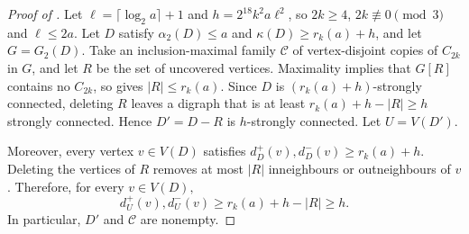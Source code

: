 \documentclass[11pt,a4paper]{article}
\theoremstyle{remark}
\numberwithin{equation}{section}
\newcommand{\calC}{\mathcal{C}}
\newcommand{\al}{\alpha_2}
\begin{document}
	\begin{proof}[Proof of ]
		Let $\ell=\lceil\log_2 a\rceil+1$ and $h=2^{18}k^2a\ell^2$, so $2k\ge4$, $2k\not\equiv0\pmod{3}$ and
		$\ell\le2a$.
		Let $D$ satisfy $\al(D)\le a$ and $\kappa(D)\ge r_k(a)+h$, and let $G=G_2(D)$.
		Take an inclusion-maximal family $\calC$ of vertex-disjoint copies of $C_{2k}$ in $G$,
		and let $R$ be the set of uncovered vertices.
		Maximality implies that $G[R]$ contains no $C_{2k}$, so
		 gives
		$
		|R|\le r_k(a).
		$
		Since $D$ is $(r_k(a)+h)$-strongly connected, deleting $R$
		leaves a digraph that is at least
		$
		r_k(a)+h-|R|\ge h
		$
		strongly connected. Hence $D'=D-R$ is $h$-strongly connected. Let $U=V(D')$.
		
		Moreover, every vertex $v\in V(D)$ satisfies
		$
		d_D^+(v),d_D^-(v)\ge r_k(a)+h.
		$
		Deleting the vertices of $R$ removes at most $|R|$ inneighbours or
		outneighbours of $v$. Therefore, for every $v\in V(D),$
		\[
		d_U^+(v),d_U^-(v)
		\ge r_k(a)+h-|R|
		\ge h.
		\]
		In particular, $D'$ and $\calC$ are nonempty.
		

\end{proof}
\end{document}
